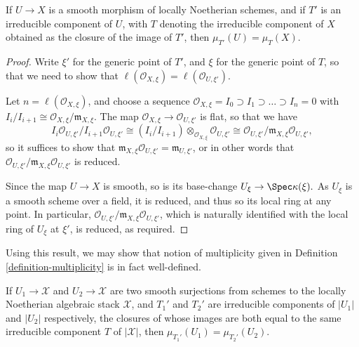 \begin{lemma}
\label{lemma-multiplicities}
If $U \to X$ is a smooth morphism of locally Noetherian schemes,
and if $T'$ is an irreducible component of $U$, with $T$ denoting
the irreducible component of $X$ obtained as the closure of the
image of $T'$, then $\mu_{T'}(U) = \mu_{T}(X).$
\end{lemma}

\begin{proof}
Write $\xi'$ for the generic point of $T'$, and $\xi$ for the
generic point of $T$, so that we need to show that $\ell(\mathcal
O_{X,\xi})=\ell(\mathcal O_{U,\xi'})$.

\medskip\noindent
Let $n=\ell(\mathcal{O}_{X,\xi})$, and choose a sequence
$\mathcal{O}_{X,\xi}=I_0\supset
I_1\supset\dots\supset I_n=0$ with $I_i/I_{i+1}\cong
\mathcal{O}_{X,\xi}/\mathfrak m_{X,\xi}$. The map
$\mathcal{O}_{X,\xi}\to\mathcal{O}_{U,\xi'}$ is
flat, so that we have
$$
I_i\mathcal{O}_{U,\xi'}/I_{i+1}\mathcal{O}_{U,\xi'}\cong
(I_i/I_{i+1})\otimes_{\mathcal{O}_{X,\xi}}\mathcal{O}_{U,\xi'} \cong
\mathcal{O}_{U,\xi'}/\mathfrak m_{X,\xi}\mathcal{O}_{U,\xi'},
$$
so it suffices to
show that
$\mathfrak m_{X,\xi}\mathcal{O}_{U,\xi'} = \mathfrak m_{U,\xi'}$,
or in other words that
$\mathcal{O}_{U,\xi'}/\mathfrak m_{X,\xi}\mathcal{O}_{U,\xi'}$ is reduced.

\medskip\noindent
Since the map $U\to X$ is smooth,
so is its base-change $U_{\xi} \to \Spec \kappa(\xi).$   As $U_{\xi}$ is a
smooth scheme over a field, it is reduced, and thus so its local ring
at any point.  In particular,
$\mathcal{O}_{U,\xi'}/\mathfrak m_{X,\xi}\mathcal{O}_{U,\xi'}$,
which is naturally identified with the local ring of $U_{\xi}$ at $\xi'$,
is reduced, as required.
\end{proof}

\noindent
Using this result, we may show that notion of multiplicity
given in
Definition \ref{definition-multiplicity} is in fact well-defined.

\begin{lemma}
\label{lemma-multiplicity}
If $U_1 \to \mathcal{X}$ and $U_2 \to \mathcal{X}$
are two smooth surjections from
schemes to the locally Noetherian algebraic stack $\mathcal{X}$,
and $T_1'$ and $T_2'$ are irreducible components of $|U_1|$
and $|U_2|$ respectively, the closures of whose images
are both equal to the same irreducible component $T$ of $|\mathcal{X}|$,
then $\mu_{T_1'}(U_1) = \mu_{T_2'}(U_2)$.
\end{lemma}

